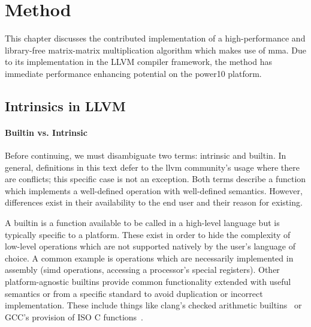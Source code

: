 \documentclass[\main/thesis.tex]{subfiles}
\begin{document}
\chapter{Method}
\label{cha:method}
This chapter discusses the contributed implementation of a high-performance and library-free matrix-matrix multiplication algorithm which makes use of \gls{mma}.
Due to its implementation in the LLVM compiler framework, the method has immediate performance enhancing potential on the \gls{power10} platform.

\section{Intrinsics in LLVM}
\subsubsection{Builtin vs. Intrinsic}
Before continuing, we must disambiguate two terms: \gls{intrinsic} and \gls{builtin}.
In general, definitions in this text defer to the \gls{llvm} community's usage where there are conflicts; this specific case is not an exception.
Both terms describe a function which implements a well-defined operation with well-defined semantics.
However, differences exist in their availability to the end user and their reason for existing.

A \gls{builtin} is a function available to be called in a high-level language but is typically specific to a platform.
These exist in order to hide the complexity of low-level operations which are not supported natively by the user's language of choice.
A common example is operations which are necessarily implemented in assembly (\eg \gls{simd} operations, accessing a processor's special registers).
Other platform-agnostic \glspl{builtin} provide common functionality extended with useful semantics or from a specific standard to avoid duplication or incorrect implementation.
These include things like \gls{clang}'s checked arithmetic builtins~\autocite{llvmCheckArith} or GCC's provision of ISO C functions~\autocite{gccOtherBuiltins}.
\end{document}
